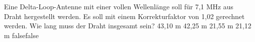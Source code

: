     {Eine Delta-Loop-Antenne mit einer vollen Wellenlänge soll für 7,1 MHz aus Draht hergestellt werden. Es soll mit einem Korrekturfaktor von 1,02 gerechnet werden. Wie lang muss der Draht insgesamt sein?}
    {43,10 m}
    {42,25 m}
    {21,55 m}
    {21,12 m}
    {false}{false}